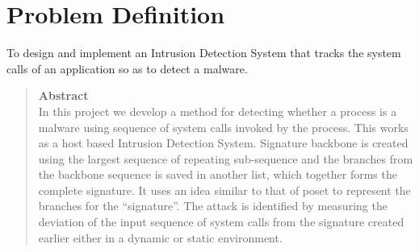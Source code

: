 \section{Problem Definition}

\textsf{To design and implement an Intrusion Detection System that tracks the system calls of an application so as to detect a malware.} \\

\begin{quotation}
    \hspace{100pt} \textbf{Abstract} \\
\textsf{In this project we develop a method for detecting whether a process is a malware using sequence  of system calls invoked by the process. This works as a host based Intrusion Detection System. Signature backbone is created using the largest sequence of repeating sub-sequence and the branches from the backbone sequence is saved in another list, which together forms the complete signature. It uses an idea similar to that of poset to represent the branches for the “signature”. The attack is identified by measuring the deviation of the input sequence of system calls from the signature created earlier either in a dynamic or static environment.}
\end{quotation}
